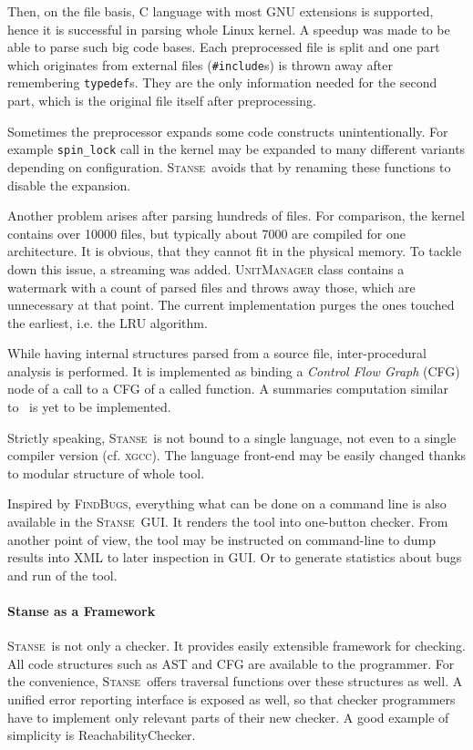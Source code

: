 \documentclass[11pt,a4paper]{article}
\newcommand{\stan}{\textsc{Stanse}}
\begin{document}
Then, on the file basis, C language with most GNU extensions is supported,
hence it is successful in parsing whole Linux kernel. A speedup was made to be
able to parse such big code bases. Each preprocessed file is split and one
part which originates from external files (\texttt{\#include}s) is thrown away
after remembering \texttt{typedef}s. They are the only information needed for
the second part, which is the original file itself after preprocessing.

Sometimes the preprocessor expands some code constructs unintentionally. For
example \texttt{spin\_lock} call in the kernel may be expanded to many
different variants depending on configuration. \stan\ avoids that by renaming
these functions to disable the expansion.

Another problem arises after parsing hundreds of files. For comparison, the
kernel contains over 10000 files, but typically about 7000 are compiled for
one architecture. It is obvious, that they cannot fit in the physical memory.
To tackle down this issue, a streaming was added. \textsc{UnitManager} class
contains a watermark with a count of parsed files and throws away those, which
are unnecessary at that point. The current implementation purges the ones
touched the earliest, i.e. the LRU algorithm.

While having internal structures parsed from a source file, inter-procedural
analysis is performed. It is implemented as binding a \emph{Control Flow
Graph} (CFG) node of a call to a CFG of a called function. A summaries
computation similar to~\cite{metal} is yet to be implemented.

Strictly speaking, \stan\ is not bound to a single language, not even
to a single compiler version (cf. \textsc{xgcc}). The language front-end may
be easily changed thanks to modular structure of whole tool.

Inspired by \textsc{FindBugs}, everything what can be done on a command line
is also available in the \stan\ GUI. It renders the tool into one-button
checker. From another point of view, the tool may be instructed on
command-line to dump results into XML to later inspection in GUI. Or to
generate statistics about bugs and run of the tool.

\paragraph{Stanse as a Framework} \stan\ is not only a checker. It provides
easily extensible framework for checking. All code structures such as AST and
CFG are available to the programmer. For the convenience, \stan\ offers
traversal functions over these structures as well. A unified error reporting
interface is exposed as well, so that checker programmers have to implement
only relevant parts of their new checker. A good example of simplicity is
ReachabilityChecker.
\end{document}
